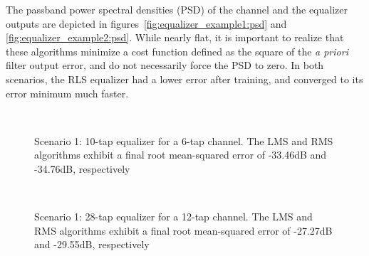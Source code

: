 The passband power spectral densities (PSD) of the channel and the equalizer outputs
are depicted in figures~\ref{fig:equalizer_example1:psd} and \ref{fig:equalizer_example2:psd}.
While nearly flat, it is important to realize that these algorithms minimize
a cost function defined as the square of the {\it a priori} filter output error,
and do not necessarily force the PSD to zero.
In both scenarios, the RLS equalizer had a lower error after training, and converged to its
error minimum much faster.



\begin{figure}[ht]
\centering
\mbox{
   \quad
   \quad
}
\mbox{
   \quad
   \quad
}
\caption{Scenario 1: 10-tap equalizer for a 6-tap channel.  The LMS and RMS algorithms exhibit
a final root mean-squared error of -33.46dB and -34.76dB, respectively }
\label{fig:equalizer_example1}
\end{figure}


\begin{figure}[ht]
\centering
\mbox{
  \subfigure[PSD] {
      \label{fig:equalizer_example2:psd}
    } \quad
  \subfigure[constellation] {
      \label{fig:equalizer_example2:constellation}
    } \quad
}
\mbox{
  \subfigure[taps] {
      \label{fig:equalizer_example2:taps}
    } \quad
   \quad
}
\caption{Scenario 1: 28-tap equalizer for a 12-tap channel.  The LMS and RMS algorithms exhibit
a final root mean-squared error of -27.27dB and -29.55dB, respectively }
\label{fig:equalizer_example2}
\end{figure}


